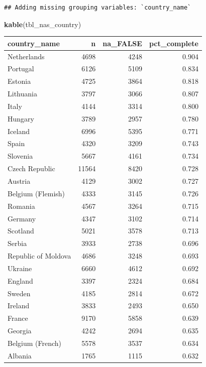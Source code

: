 \documentclass[
]{article}
\newenvironment{Shaded}{\begin{snugshade}}{\end{snugshade}}
\newcommand{\FunctionTok}[1]{\textcolor[rgb]{0.13,0.29,0.53}{\textbf{#1}}}
\newcommand{\NormalTok}[1]{#1}
\begin{document}
\begin{verbatim}
## Adding missing grouping variables: `country_name`
\end{verbatim}

\begin{Shaded}
\begin{Highlighting}[]
\FunctionTok{kable}\NormalTok{(tbl\_nas\_country)}
\end{Highlighting}
\end{Shaded}

\begin{longtable}[]{@{}lrrr@{}}
\toprule\noalign{}
country\_name & n & na\_FALSE & pct\_complete \\
\midrule\noalign{}
\endhead
\bottomrule\noalign{}
\endlastfoot
Netherlands & 4698 & 4248 & 0.904 \\
Portugal & 6126 & 5109 & 0.834 \\
Estonia & 4725 & 3864 & 0.818 \\
Lithuania & 3797 & 3066 & 0.807 \\
Italy & 4144 & 3314 & 0.800 \\
Hungary & 3789 & 2957 & 0.780 \\
Iceland & 6996 & 5395 & 0.771 \\
Spain & 4320 & 3209 & 0.743 \\
Slovenia & 5667 & 4161 & 0.734 \\
Czech Republic & 11564 & 8420 & 0.728 \\
Austria & 4129 & 3002 & 0.727 \\
Belgium (Flemish) & 4333 & 3145 & 0.726 \\
Romania & 4567 & 3264 & 0.715 \\
Germany & 4347 & 3102 & 0.714 \\
Scotland & 5021 & 3578 & 0.713 \\
Serbia & 3933 & 2738 & 0.696 \\
Republic of Moldova & 4686 & 3248 & 0.693 \\
Ukraine & 6660 & 4612 & 0.692 \\
England & 3397 & 2324 & 0.684 \\
Sweden & 4185 & 2814 & 0.672 \\
Ireland & 3833 & 2493 & 0.650 \\
France & 9170 & 5858 & 0.639 \\
Georgia & 4242 & 2694 & 0.635 \\
Belgium (French) & 5578 & 3537 & 0.634 \\
Albania & 1765 & 1115 & 0.632 \\

\end{longtable}
\end{document}
